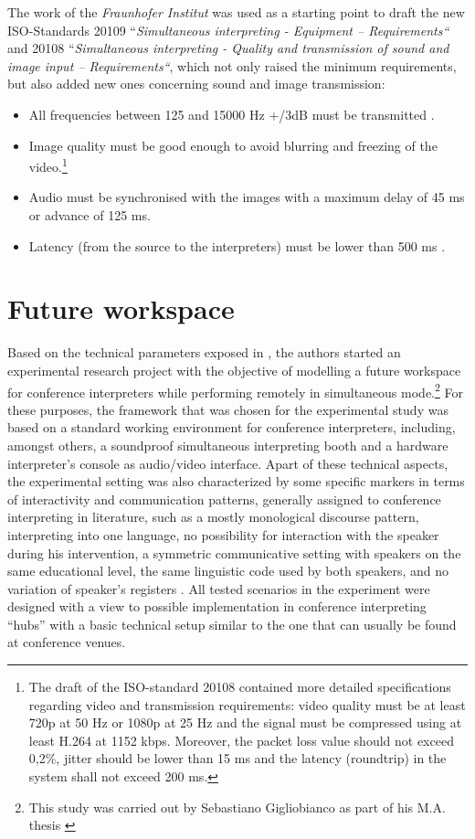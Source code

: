 \documentclass[output=paper]{langsci/langscibook}
\begin{document}
The work of the \textit{Fraunhofer Institut} was used as a starting point to draft the new \textsc{ISO}-Standards 20109 “\textit{Simultaneous interpreting - Equipment – Requirements“} and 20108 “\textit{Simultaneous interpreting - Quality and transmission of sound and image input – Requirements“}, which not only raised the minimum requirements, but also added new ones concerning sound and image transmission:

\begin{itemize}
\item All frequencies between 125 and 15000 Hz +/\textminus 3dB must be transmitted \citep[3]{ISO20109}.
\item Image quality must be good enough to avoid blurring and freezing of the video.\footnote{The draft of the \textsc{ISO}-standard 20108 contained more detailed specifications regarding video and transmission requirements: video quality must be at least 720p at 50 Hz or 1080p at 25 Hz and the signal must be compressed using at least H.264 at 1152 kbps. Moreover, the packet loss value should not exceed 0,2\%, jitter should be lower than 15 ms and the latency (roundtrip) in the system shall not exceed 200 ms.}
\item Audio must be synchronised with the images with a maximum delay of 45 ms or advance of 125 ms.
\item Latency (from the source to the interpreters) must be lower than 500 ms \citep[7-8]{ISO20108}.
\end{itemize}

\section{Future workspace}
\label{sec:ziegler:06}
Based on the technical parameters exposed in , the authors started an experimental research project with the objective of modelling a future workspace for conference interpreters while performing remotely in simultaneous mode.\footnote{This study was carried out by Sebastiano Gigliobianco as part of his M.A. thesis \citep{Gigliobianco2017}} For these purposes, the framework that was chosen for the experimental study was based on a standard working environment for conference interpreters, including, amongst others, a soundproof simultaneous interpreting booth and a hardware interpreter’s console as audio/video interface. Apart of these technical aspects, the experimental setting was also characterized by some specific markers in terms of interactivity and communication patterns, generally assigned to conference interpreting in literature, such as a mostly monological discourse pattern, interpreting into one language, no possibility for interaction with the speaker during his intervention, a symmetric communicative setting with speakers on the same educational level, the same linguistic code used by both speakers, and no variation of speaker’s registers \citep[582-583]{Angelelli2000}. All tested scenarios in the experiment were designed with a view to possible implementation in conference interpreting “hubs” with a basic technical setup similar to the one that can usually be found at conference venues.
\end{document}

